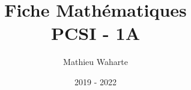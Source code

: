 \documentclass[12 pt]{book}
\title{Fiche Mathématiques \\ PCSI - 1A}
\author{Mathieu Waharte}
\date{2019 - 2022}
\begin{document}
\maketitle
\newpage

\newcommand{\mA}{\mathcal{A}}
\newcommand{\mB}{\mathcal{B}}
\newcommand{\mC}{\mathcal{C}}
\newcommand{\mD}{\mathcal{D}}
\newcommand{\mE}{\mathcal{E}}
\newcommand{\mF}{\mathcal{F}}
\newcommand{\mG}{\mathcal{G}}
\newcommand{\mH}{\mathcal{H}}
\newcommand{\mI}{\mathcal{I}}
\newcommand{\mJ}{\mathcal{J}}
\newcommand{\mK}{\mathcal{K}}
\newcommand{\mL}{\mathcal{L}}
\newcommand{\mM}{\mathcal{M}}
\newcommand{\mN}{\mathcal{N}}
\newcommand{\mO}{\mathcal{O}}
\newcommand{\mP}{\mathcal{P}}
\newcommand{\mQ}{\mathcal{Q}}
\newcommand{\mR}{\mathcal{R}}
\newcommand{\mS}{\mathcal{S}}
\newcommand{\mT}{\mathcal{T}}
\newcommand{\mU}{\mathcal{U}}
\newcommand{\mV}{\mathcal{V}}
\newcommand{\mW}{\mathcal{W}}
\newcommand{\mX}{\mathcal{X}}
\newcommand{\mY}{\mathcal{Y}}
\newcommand{\mZ}{\mathcal{Z}}

\newcommand{\R}{\mathbb{R}}
\newcommand{\N}{\mathbb{N}}
\newcommand{\C}{\mathbb{C}}
\newcommand{\Z}{\mathbb{Z}}
\newcommand{\U}{\mathbb{U}}
\newcommand{\D}{\mathbb{D}}
\newcommand{\K}{\mathbb{K}}
\newcommand{\bP}{\mathbb{P}}
\newcommand{\E}{\mathbb{E}}
\newcommand{\V}{\mathbb{V}}

\newcommand{\sA}{\mathscr{A}}
\newcommand{\sB}{\mathscr{B}}
\newcommand{\sC}{\mathscr{C}}
\newcommand{\sD}{\mathscr{D}}
\newcommand{\sE}{\mathscr{E}}
\newcommand{\sF}{\mathscr{F}}
\newcommand{\sG}{\mathscr{G}}
\newcommand{\sH}{\mathscr{H}}
\newcommand{\sI}{\mathscr{I}}
\newcommand{\sJ}{\mathscr{J}}
\newcommand{\sK}{\mathscr{K}}
\newcommand{\sL}{\mathscr{L}}
\newcommand{\sM}{\mathscr{M}}
\newcommand{\sN}{\mathscr{N}}
\newcommand{\sO}{\mathscr{O}}
\newcommand{\sP}{\mathscr{P}}
\newcommand{\sQ}{\mathscr{Q}}
\newcommand{\sR}{\mathscr{R}}
\newcommand{\sS}{\mathscr{S}}
\newcommand{\sT}{\mathscr{T}}
\newcommand{\sU}{\mathscr{U}}
\newcommand{\sV}{\mathscr{V}}
\newcommand{\sW}{\mathscr{W}}
\newcommand{\sX}{\mathscr{X}}
\newcommand{\sY}{\mathscr{Y}}
\newcommand{\sZ}{\mathscr{Z}}

\newcommand{\Mat}{\text{Mat}}
\newcommand{\1}{\mathds{1}}

\newcommand{\Ra}{\Rightarrow}
\newcommand{\ra}{\rightarrow}
\newcommand{\La}{\Leftarrow}
\newcommand{\la}{\leftarrow}
\newcommand{\Da}{\Leftrightarrow}
\newcommand{\da}{\leftrightarrow}

\newcommand{\0}{\emptyset}

\newcommand*\circled[1]{\tikz[baseline=(char.base)]{
    \node[shape=circle,draw,inner sep=2pt] (char) {#1};}}
    
\end{document}
